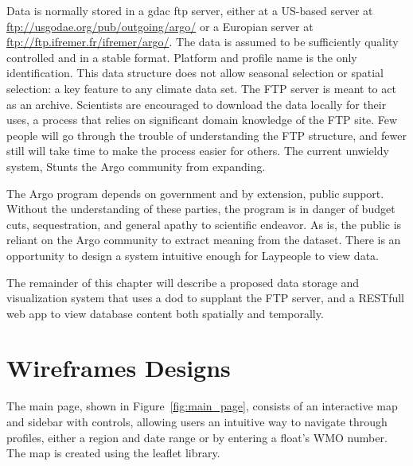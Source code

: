 Data is normally stored in a \gls{gdac} \gls{ftp} server, either at a US-based server at \url{ftp://usgodae.org/pub/outgoing/argo/} or a Europian server at \url{ftp://ftp.ifremer.fr/ifremer/argo/}. The data is assumed to be sufficiently quality controlled and in a stable format. Platform and profile name is the only identification. This data structure does not allow seasonal selection or spatial selection: a key feature to any climate data set. The FTP server is meant to act as an archive. Scientists are encouraged to download the data locally for their uses, a process that relies on significant domain knowledge of the FTP site. Few people will go through the trouble of understanding the FTP structure, and fewer still will take time to make the process easier for others. The current unwieldy system, Stunts the Argo community from expanding.

The Argo program depends on government and by extension, public support. Without the understanding of these parties, the program is in danger of budget cuts, sequestration, and general apathy to scientific endeavor. As is, the public is reliant on the Argo community to extract meaning from the dataset. There is an opportunity to design a system intuitive enough for Laypeople to view data. 

The remainder of this chapter will describe a proposed data storage and visualization system that uses a \gls{dod} to supplant the FTP server, and a RESTfull web app to view database content both spatially and temporally.

\section{Wireframes Designs}
The main page, shown in Figure~\ref{fig:main_page}, consists of an interactive map and sidebar with controls, allowing users an intuitive way to navigate through profiles, either a region and date range or by entering a float's WMO number. The map is created using the \gls{leaflet} library.

